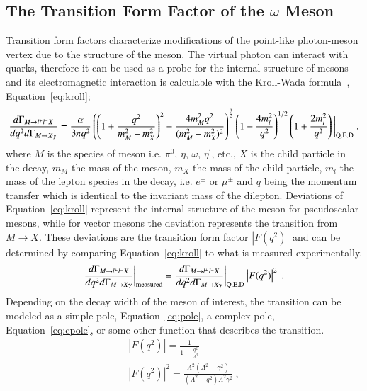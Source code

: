 \documentclass[epj]{webofc}
\begin{document}
\subsection{The Transition Form Factor  of the $\omega$ Meson}
Transition form factors characterize modifications of the point-like photon-meson vertex due to the structure of the meson. The virtual photon can interact with quarks, therefore it can be used as a probe for the internal structure of mesons and its electromagnetic interaction is calculable with the Kroll-Wada formula~\cite{bib4}, Equation~\ref{eq:kroll};
\begin{equation}
\frac{d\Gamma_{M{\rightarrow l^{+}l^{-}X}}}{dq^{2} d\Gamma_{M{\rightarrow X\gamma}}} = \frac{\alpha}{3\pi q^{2}}\left(\left(1+\frac{q^{2}}{m^{2}_{M}-m^{2}_{X}}\right)^2 - \frac{4m^{2}_{M}q^2}{(m^{2}_{M}-m^{2}_{X})^2}\right)^\frac{3}{2}\left(1-\frac{4m_{l}^{2}}{q^{2}}\right)^{1/2}\left(1+\frac{2m_{l}^{2}}{q^{2}}\right) \bigg|_{\mathrm{Q.E.D}}  \label{eq:kroll} \ . \\
\end{equation}
 where $M$ is the species of meson i.e. $\pi^0$, $\eta$, $\omega$, $\eta^{\prime}$, etc., $X$ is the child particle in the decay, $m_M$ the mass of the meson, $m_X$ the mass of the child particle, $m_l$ the mass of the lepton species in the decay, i.e. $e^{\pm}$ or $\mu^{\pm}$ and $q$ being the momentum transfer which is identical to the invariant mass of the dilepton. Deviations of Equation~\ref{eq:kroll} represent the internal structure of the meson for pseudoscalar mesons, while for vector mesons the deviation represents the transition from $M \to X$. These deviations are the transition form factor $\left| F(q^2)\right|$ and can be determined by comparing Equation~\ref{eq:kroll} to what is measured experimentally.
 \begin{equation}
 \frac{d\Gamma_{M{\rightarrow l^{+}l^{-}X}}}{dq^{2} d\Gamma_{M{\rightarrow X\gamma}}}\bigg|_{\mathrm{measured}} =   \frac{d\Gamma_{M{\rightarrow l^{+}l^{-}X}}}{dq^{2} d\Gamma_{M{\rightarrow X\gamma}}} \bigg|_{\mathrm{Q.E.D}} \left| F(q^2)\right|^2 \label{eq:kroll_ff} \ . \\
 \end{equation}
 Depending on the decay width of the meson of interest, the transition can be modeled as a simple pole, Equation~\ref{eq:pole}, a complex pole, Equation~\ref{eq:cpole}, or some other function that describes the transition.
 \begin{eqnarray}
\left| F(q^2)\right| = \frac{1}{1-\frac{q^2}{\Lambda^2}} \label{eq:pole} \\
\left| F(q^2)\right|^2 = \frac{\Lambda^2(\Lambda^2 + \gamma^2)}{(\Lambda^2 - q^2)\Lambda^2 \gamma^2} \label{eq:cpole} \ ,
 \end{eqnarray} 
\end{document}
